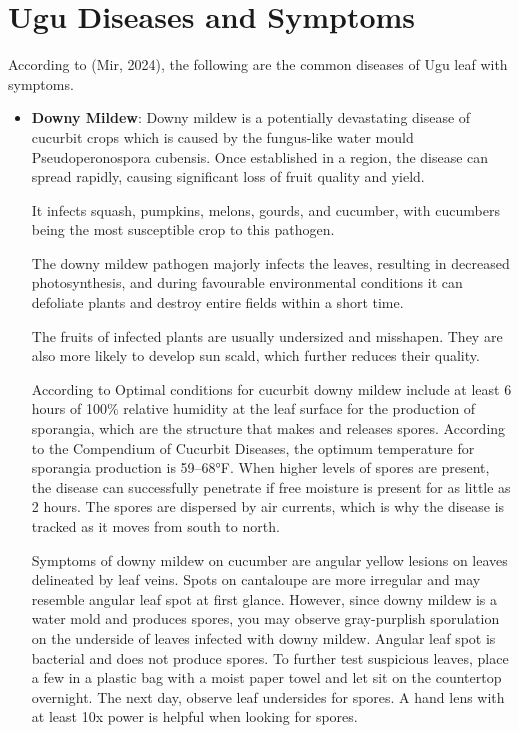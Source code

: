\section{Ugu Diseases and Symptoms}
According to (Mir, 2024), the following are the common diseases of Ugu leaf with symptoms.
\begin{itemize}
	\item {\bfseries Downy Mildew}: 
	Downy mildew is a potentially devastating disease of cucurbit crops which is caused by the fungus-like water mould Pseudoperonospora cubensis. Once established in a region, the disease can spread rapidly, causing significant loss of fruit quality and yield.
	
	It infects squash, pumpkins, melons, gourds, and cucumber, with cucumbers being the most susceptible crop to this pathogen.
	
	The downy mildew pathogen majorly infects the leaves, resulting in decreased photosynthesis, and during favourable environmental conditions it can defoliate plants and destroy entire fields within a short time.
	
	The fruits of infected plants are usually undersized and misshapen. They are also more likely to develop sun scald, which further reduces their quality. \citep{DownyMildewCucurbits2025}
	
	According to \citep{CucurbitDownyMildew}
	Optimal conditions for cucurbit downy mildew include at least 6 hours of 100\% relative humidity at the leaf surface for the production of sporangia, which are the structure that makes and releases spores. According to the Compendium of Cucurbit Diseases, the optimum temperature for sporangia production is 59–68°F. When higher levels of spores are present, the disease can successfully penetrate if free moisture is present for as little as 2 hours. The spores are dispersed by air currents, which is why the disease is tracked as it moves from south to north.
	
	Symptoms of downy mildew on cucumber are angular yellow lesions on leaves delineated by leaf veins. Spots on cantaloupe are more irregular and may resemble angular leaf spot at first glance. However, since downy mildew is a water mold and produces spores, you may observe gray-purplish sporulation on the underside of leaves infected with downy mildew. Angular leaf spot is bacterial and does not produce spores. To further test suspicious leaves, place a few in a plastic bag with a moist paper towel and let sit on the countertop overnight. The next day, observe leaf undersides for spores. A hand lens with at least 10x power is helpful when looking for spores. 
	

\end{itemize}
